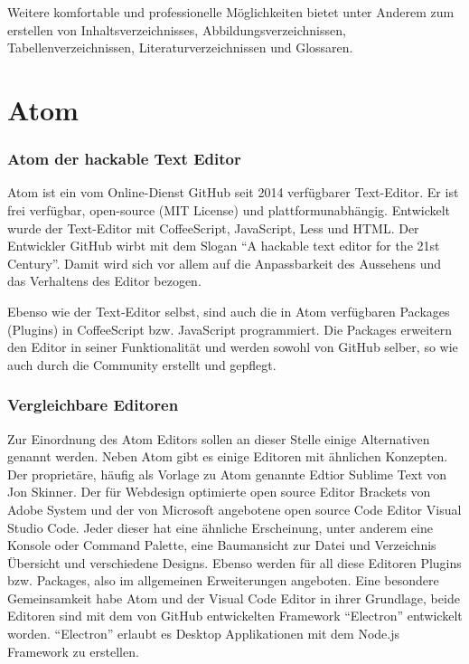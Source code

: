     Weitere komfortable und professionelle Möglichkeiten bietet \tex unter Anderem zum erstellen von Inhaltsverzeichnisses, Abbildungsverzeichnissen, Tabellenverzeichnissen, Literaturverzeichnissen und Glossaren.

\part{Atom}
    \section{Atom der hackable Text Editor}
    Atom ist ein vom Online-Dienst GitHub seit 2014 verfügbarer Text-Editor. Er ist frei verfügbar, open-source (MIT License) und plattformunabhängig. Entwickelt wurde der Text-Editor mit CoffeeScript, JavaScript, Less und HTML. Der Entwickler GitHub wirbt mit dem Slogan "`A hackable text editor for the 21st Century"'. Damit wird sich vor allem auf die Anpassbarkeit des Aussehens und das Verhaltens des Editor bezogen.

    Ebenso wie der Text-Editor selbst, sind auch die in Atom verfügbaren Packages (Plugins) in CoffeeScript bzw. JavaScript programmiert. Die Packages erweitern den Editor in seiner Funktionalität und werden sowohl von GitHub selber, so wie auch durch die Community erstellt und gepflegt.

    \section{Vergleichbare Editoren}
    Zur Einordnung des Atom Editors sollen an dieser Stelle einige Alternativen genannt werden. Neben Atom gibt es einige Editoren mit ähnlichen Konzepten. Der proprietäre, häufig als Vorlage zu Atom genannte Edtior Sublime Text von Jon Skinner. Der für Webdesign optimierte open source Editor Brackets von Adobe System und der von Microsoft angebotene open source Code Editor Visual Studio Code. Jeder dieser hat eine ähnliche Erscheinung, unter anderem eine Konsole oder Command Palette, eine Baumansicht zur Datei und Verzeichnis Übersicht und verschiedene Designs. Ebenso werden für all diese Editoren Plugins bzw. Packages, also im allgemeinen Erweiterungen angeboten. Eine besondere Gemeinsamkeit habe Atom und der Visual Code Editor in ihrer Grundlage, beide Editoren sind mit dem von GitHub entwickelten Framework "`Electron"' entwickelt worden. "`Electron"' erlaubt es Desktop Applikationen mit dem Node.js Framework zu erstellen.

